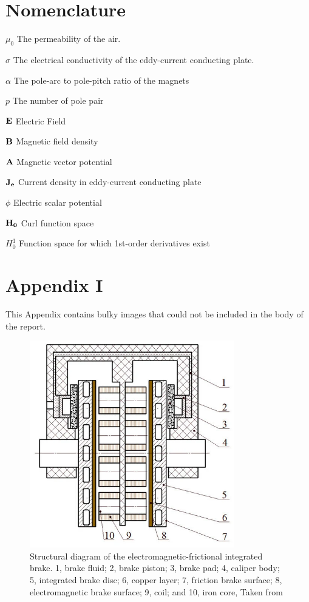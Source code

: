 \documentclass[lettersize,journal]{IEEEtran}
\begin{document}
\section*{Nomenclature}
\begin{IEEEdescription}
\item[$\mu_0$] The permeability of the air.
\item[$\sigma$] The electrical conductivity of the eddy-current conducting plate.
\item[$\alpha$] The pole-arc to pole-pitch ratio of the magnets
\item[$p$] The number of pole pair
\item[$\bold{E}$] Electric Field
\item[$\bold{B}$] Magnetic field density
\item[$\bold{A}$] Magnetic vector potential
\item[$\bold{J_e}$] Current density in eddy-current conducting plate
\item[$\phi$] Electric scalar potential
\item[$\bold{H_0}$] Curl function space
\item[$H^{1}_0$] Function space for which 1st-order derivatives exist


\end{IEEEdescription}


\appendicies 
\section{Appendix I}
This Appendix contains bulky images that could not be included in the body of the report.

\begin{figure}[!htp]
\centering
\includegraphics[width=3.5in]{images/fig2.png}
\caption{Structural diagram of the electromagnetic-frictional integrated brake. 1, brake fluid; 2, brake piston; 3, brake pad; 4, caliper body; 5, integrated brake disc; 6, copper layer; 7, friction brake surface; 8, electromagnetic brake surface; 9, coil; and 10, iron core, Taken from \cite{wang_2019_performances}}
\label{fig8}
\end{figure}
\end{document}
